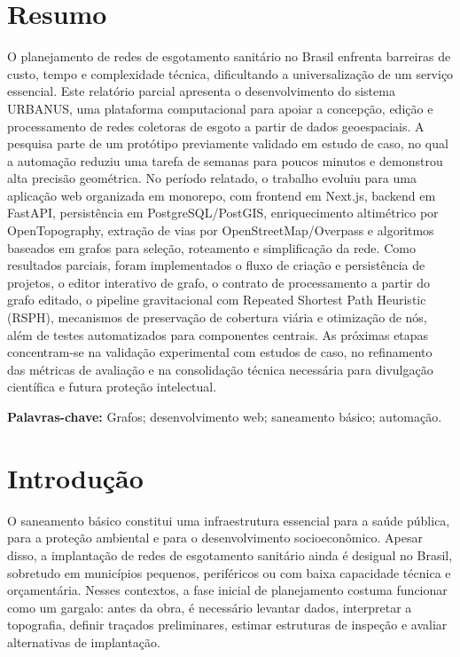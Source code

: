 \documentclass[12pt,a4paper]{article}
\begin{document}
\clearpage
\tableofcontents
\clearpage

\section*{Resumo}
O planejamento de redes de esgotamento sanitário no Brasil enfrenta barreiras de custo, tempo e complexidade técnica, dificultando a universalização de um serviço essencial. Este relatório parcial apresenta o desenvolvimento do sistema URBANUS, uma plataforma computacional para apoiar a concepção, edição e processamento de redes coletoras de esgoto a partir de dados geoespaciais. A pesquisa parte de um protótipo previamente validado em estudo de caso, no qual a automação reduziu uma tarefa de semanas para poucos minutos e demonstrou alta precisão geométrica. No período relatado, o trabalho evoluiu para uma aplicação web organizada em monorepo, com frontend em Next.js, backend em FastAPI, persistência em PostgreSQL/PostGIS, enriquecimento altimétrico por OpenTopography, extração de vias por OpenStreetMap/Overpass e algoritmos baseados em grafos para seleção, roteamento e simplificação da rede. Como resultados parciais, foram implementados o fluxo de criação e persistência de projetos, o editor interativo de grafo, o contrato de processamento a partir do grafo editado, o pipeline gravitacional com Repeated Shortest Path Heuristic (RSPH), mecanismos de preservação de cobertura viária e otimização de nós, além de testes automatizados para componentes centrais. As próximas etapas concentram-se na validação experimental com estudos de caso, no refinamento das métricas de avaliação e na consolidação técnica necessária para divulgação científica e futura proteção intelectual.

\noindent\textbf{Palavras-chave:} Grafos; desenvolvimento web; saneamento básico; automação.

\clearpage

\section{Introdução}

O saneamento básico constitui uma infraestrutura essencial para a saúde pública, para a proteção ambiental e para o desenvolvimento socioeconômico. Apesar disso, a implantação de redes de esgotamento sanitário ainda é desigual no Brasil, sobretudo em municípios pequenos, periféricos ou com baixa capacidade técnica e orçamentária. Nesses contextos, a fase inicial de planejamento costuma funcionar como um gargalo: antes da obra, é necessário levantar dados, interpretar a topografia, definir traçados preliminares, estimar estruturas de inspeção e avaliar alternativas de implantação.
\end{document}
